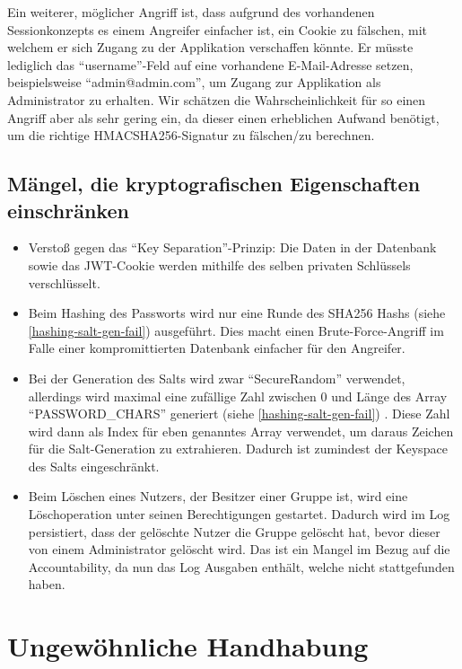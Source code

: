 \documentclass[12pt,DIV14,BCOR10mm,a4paper,parskip=half-,headsepline,headinclude,english,ngerman,bibliography=totocnumbered]{scrreprt}
\begin{document}
Ein weiterer, möglicher Angriff ist, dass aufgrund des vorhandenen Sessionkonzepts es einem Angreifer einfacher ist, ein Cookie zu fälschen, mit welchem er sich Zugang zu der Applikation verschaffen könnte.
Er müsste lediglich das \enquote{username}-Feld auf eine vorhandene E-Mail-Adresse setzen, beispielsweise \enquote{admin@admin.com}, um Zugang zur Applikation als Administrator zu erhalten.
Wir schätzen die Wahrscheinlichkeit für so einen Angriff aber als sehr gering ein, da dieser einen erheblichen Aufwand benötigt, um die richtige HMACSHA256-Signatur zu fälschen/zu berechnen.

\section{Mängel, die kryptografischen Eigenschaften einschränken}

\begin{itemize}
  \item Verstoß gegen das \enquote{Key Separation}-Prinzip: Die Daten in der Datenbank sowie das JWT-Cookie werden mithilfe des selben privaten Schlüssels verschlüsselt.
  \item Beim Hashing des Passworts wird nur eine Runde des SHA256 Hashs (siehe \ref{hashing-salt-gen-fail}) ausgeführt. Dies macht einen Brute-Force-Angriff im Falle einer kompromittierten Datenbank einfacher für den Angreifer.
  \item Bei der Generation des Salts wird zwar \enquote{SecureRandom} verwendet, allerdings wird maximal eine zufällige Zahl zwischen 0 und Länge des Array \enquote{PASSWORD\_CHARS} generiert (siehe \ref{hashing-salt-gen-fail}) . Diese Zahl wird dann als Index für eben genanntes Array verwendet, um daraus Zeichen für die Salt-Generation zu extrahieren. Dadurch ist zumindest der Keyspace des Salts eingeschränkt.
  \item Beim Löschen eines Nutzers, der Besitzer einer Gruppe ist, wird eine Löschoperation unter seinen Berechtigungen gestartet. Dadurch wird im Log persistiert, dass der gelöschte Nutzer die Gruppe gelöscht hat, bevor dieser von einem Administrator gelöscht wird. Das ist ein Mangel im Bezug auf die Accountability, da nun das Log Ausgaben enthält, welche nicht stattgefunden haben.
\end{itemize}

\chapter{Ungewöhnliche Handhabung}
\end{document}
